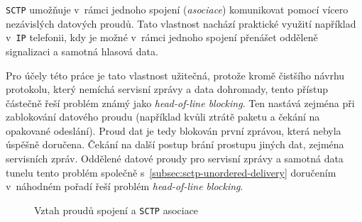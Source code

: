 \documentclass[thesis=M,czech]{FITthesis}[2012/10/20]
\begin{document}
    \texttt{SCTP} umožňuje v~rámci jednoho spojení (\textit{asociace}) komunikovat pomocí vícero nezávislých datových proudů. Tato vlastnost nachází praktické využití například v~\texttt{IP} telefonii, kdy je možné v~rámci jednoho spojení přenášet odděleně signalizaci a samotná hlasová data.
    
    Pro účely této práce je tato vlastnost užitečná, protože kromě čistšího návrhu protokolu, který nemíchá servisní zprávy a data dohromady, tento přístup částečně řeší problém známý jako \textit{head-of-line blocking}. Ten nastává zejména při zablokování datového proudu (například kvůli ztrátě paketu a čekání na opakované odeslání). Proud dat je tedy blokován první zprávou, která nebyla úspěšně doručena. Čekání na další postup brání prostupu jiných dat, zejména servisních zpráv. Oddělené datové proudy pro servisní zprávy a samotná data tunelu tento problém společně s~\ref{subsec:sctp-unordered-delivery} doručením v~náhodném pořadí řeší problém \textit{head-of-line blocking}.
    
      
\begin{figure}[h]
 \centering

\caption{Vztah proudů spojení a \texttt{SCTP} asociace}
\label{diag:sctp-streams}
\end{figure}
    
\end{document}
